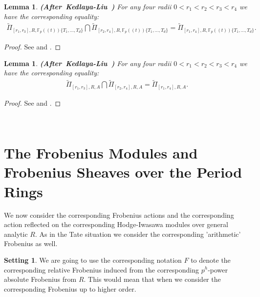 \documentclass[12pt]{amsart}
\newtheorem{lemma}[theorem]{Lemma}
\theoremstyle{definition}
\numberwithin{equation}{section}
\newtheorem{setting}[theorem]{Setting}
\begin{document}
\begin{lemma} \mbox{\bf{(After Kedlaya-Liu \cite[Lemma 5.2.10]{KL2})}}
For any four radii $0<r_1<r_2<r_3<r_4$ we have the corresponding equality:
\begin{align}
\widetilde{\Pi}_{[r_1,r_3],R,\mathbb{F}_p((t))\{T_1,...,T_d\}}\bigcap \widetilde{\Pi}_{[r_2,r_4],R,\mathbb{F}_p((t))\{T_1,...,T_d\}}	=\widetilde{\Pi}_{[r_1,r_4],R,\mathbb{F}_p((t))\{T_1,...,T_d\}}.
\end{align}

\end{lemma}


\begin{proof}
See \cite[Lemma 5.2.10]{KL2} and \cite[Proposition 2.16]{XT2}.	
\end{proof}


\begin{lemma} \mbox{\bf{(After Kedlaya-Liu \cite[Lemma 5.2.10]{KL2})}}
For any four radii $0<r_1<r_2<r_3<r_4$ we have the corresponding equality:
\begin{align}
\widetilde{\Pi}_{[r_1,r_3],R,A}\bigcap \widetilde{\Pi}_{[r_2,r_4],R,A}	=\widetilde{\Pi}_{[r_1,r_4],R,A}.
\end{align}

\end{lemma}


\begin{proof}
See \cite[Lemma 5.2.10]{KL2} and \cite[Proposition 2.17]{XT2}.	
\end{proof}










\




\section{The Frobenius Modules and Frobenius Sheaves over the Period Rings} \label{chapter3}
 
\noindent We now consider the corresponding Frobenius actions and the corresponding action reflected on the corresponding Hodge-Iwasawa modules over general analytic $R$. As in the Tate situation we consider the corresponding 'arithmetic' Frobenius as well. 


\begin{setting}
We are going to use the corresponding notation $F$ to denote the corresponding relative Frobenius induced from the corresponding $p^h$-power absolute Frobenius from $R$. This would mean that when we consider the corresponding Frobenius up to higher order.
\end{setting}
\end{document}
